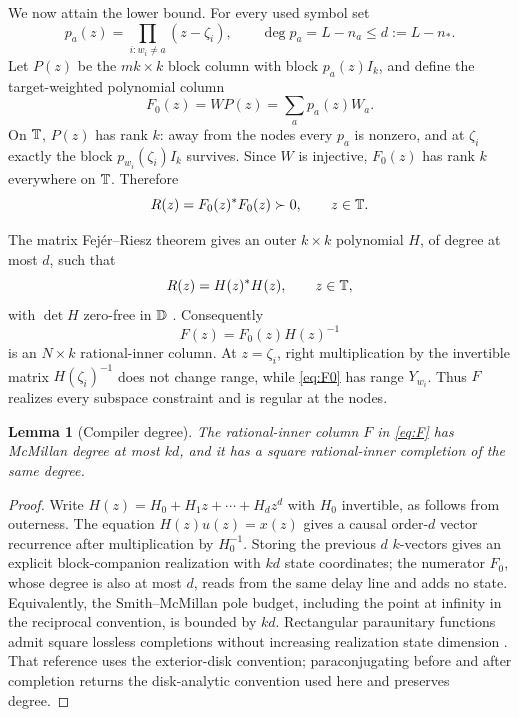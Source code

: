 \documentclass[11pt]{article}
\newtheorem{lemma}[theorem]{Lemma}
\theoremstyle{definition}\newtheorem{definition}[theorem]{Definition}\newtheorem{example}[theorem]{Example}
\theoremstyle{remark}\newtheorem{remark}[theorem]{Remark}\newtheorem{limitation}[theorem]{Limitation}
\begin{document}
We now attain the lower bound.  For every used symbol set
\begin{equation}\label{eq:pa}
 p_a(z)=\prod_{i:w_i\ne a}(z-\zeta_i),
 \qquad \deg p_a=L-n_a\le d:=L-n_*.
\end{equation}
Let $P(z)$ be the $mk\times k$ block column with block $p_a(z)I_k$, and
define the target-weighted polynomial column
\begin{equation}\label{eq:F0}
                       F_0(z)=WP(z)=\sum_a p_a(z)W_a.
\end{equation}
On $\mathbb T$, $P(z)$ has rank $k$: away from the nodes every $p_a$ is nonzero,
and at $\zeta_i$ exactly the block $p_{w_i}(\zeta_i)I_k$ survives.  Since
$W$ is injective, $F_0(z)$ has rank $k$ everywhere on $\mathbb T$.  Therefore
\begin{equation}\label{eq:R}
                         R(z)=F_0(z)^*F_0(z)\succ0,
                         \qquad z\in\mathbb T.
\end{equation}

The matrix Fej\'er--Riesz theorem gives an outer $k\times k$ polynomial
$H$, of degree at most $d$, such that
\begin{equation}\label{eq:FR}
                         R(z)=H(z)^*H(z),\qquad z\in\mathbb T,
\end{equation}
with $\det H$ zero-free in $\mathbb D$ \cite{DritschelRovnyak2009}.
Consequently
\begin{equation}\label{eq:F}
                              F(z)=F_0(z)H(z)^{-1}
\end{equation}
is an $N\times k$ rational-inner column.  At $z=\zeta_i$, right
multiplication by the invertible matrix $H(\zeta_i)^{-1}$ does not change
range, while \cref{eq:F0} has range $Y_{w_i}$.  Thus $F$ realizes every
subspace constraint and is regular at the nodes.

\begin{lemma}[Compiler degree]\label{lem:compiler-degree}
The rational-inner column $F$ in \cref{eq:F} has McMillan degree at most
$kd$, and it has a square rational-inner completion of the same degree.
\end{lemma}

\begin{proof}
Write $H(z)=H_0+H_1z+\cdots+H_dz^d$ with $H_0$ invertible, as follows from
outerness.  The equation $H(z)u(z)=x(z)$ gives a causal order-$d$ vector
recurrence after multiplication by $H_0^{-1}$.  Storing the previous $d$
$k$-vectors gives an explicit block-companion realization with $kd$ state
coordinates; the numerator $F_0$, whose degree is also at most $d$, reads
from the same delay line and adds no state.  Equivalently, the
Smith--McMillan pole budget, including the point at infinity in the
reciprocal convention, is bounded by $kd$.
Rectangular paraunitary functions admit square lossless completions without
increasing realization state dimension
\cite[Theorem~2.1(ii)]{AlpayJorgensenLewkowicz2016}.  That reference uses
the exterior-disk convention; paraconjugating before and after completion
returns the disk-analytic convention used here and preserves degree.
\end{proof}
\end{document}
